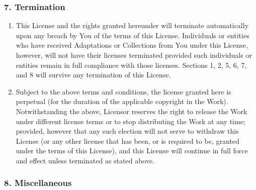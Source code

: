         \subsubsection{7. Termination}

\begin{enumerate}
          \item This License and the rights granted hereunder will
          terminate automatically upon any breach by You of the
          terms of this License. Individuals or entities who have
          received Adaptations or Collections from You under this
          License, however, will not have their licenses terminated
          provided such individuals or entities remain in full
          compliance with those licenses. Sections 1, 2, 5, 6, 7,
          and 8 will survive any termination of this License.

          \item Subject to the above terms and conditions, the
          license granted here is perpetual (for the duration of
          the applicable copyright in the Work). Notwithstanding
          the above, Licensor reserves the right to release the
          Work under different license terms or to stop
          distributing the Work at any time; provided, however that
          any such election will not serve to withdraw this License
          (or any other license that has been, or is required to
          be, granted under the terms of this License), and this
          License will continue in full force and effect unless
          terminated as stated above.
\end{enumerate}

        \subsubsection{8. Miscellaneous}

